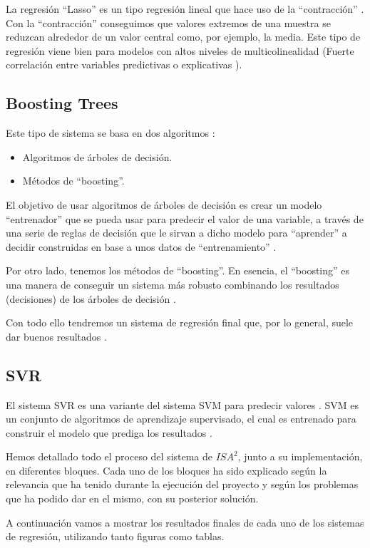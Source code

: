 La regresión ``Lasso'' \cite{lasso} es un tipo regresión lineal que hace uso de la ``contracción'' \cite{shrinkage}. Con la ``contracción'' conseguimos que valores extremos de una muestra se reduzcan alrededor de un valor central como, por ejemplo, la media. Este tipo de regresión viene bien para modelos con altos niveles de multicolinealidad (Fuerte correlación entre variables predictivas o explicativas \cite{multicollinearity}).

\subsection{Boosting Trees}

Este tipo de sistema se basa en dos algoritmos \cite{boosting-trees}:

\begin{itemize}
\item Algoritmos de árboles de decisión.
\item Métodos de ``boosting''.
\end{itemize}

El objetivo de usar algoritmos de árboles de decisión es crear un modelo ``entrenador'' que se pueda usar para predecir el valor de una variable, a través de una serie de reglas de decisión que le sirvan a dicho modelo para ``aprender'' a decidir construidas en base a unos datos de ``entrenamiento'' \cite{decision-tree}.

Por otro lado, tenemos los métodos de ``boosting''. En esencia, el ``boosting'' es una manera de conseguir un sistema más robusto combinando los resultados (decisiones) de los árboles de decisión \cite{boosting}.

Con todo ello tendremos un sistema de regresión final que, por lo general, suele dar buenos resultados \cite{isa2}.

\subsection{SVR}

El sistema \ac{SVR} es una variante del sistema \ac{SVM} para predecir valores \cite{SVR}. \ac{SVM} es un conjunto de algoritmos de aprendizaje supervisado, el cual es entrenado para construir el modelo que prediga los resultados \cite{SVR}.

Hemos detallado todo el proceso del sistema de $ISA^{2}$, junto a su implementación, en diferentes bloques. Cada uno de los bloques ha sido explicado según la relevancia que ha tenido durante la ejecución del proyecto y según los problemas que ha podido dar en el mismo, con su posterior solución.

A continuación vamos a mostrar los resultados finales de cada uno de los sistemas de regresión, utilizando tanto figuras como tablas.

